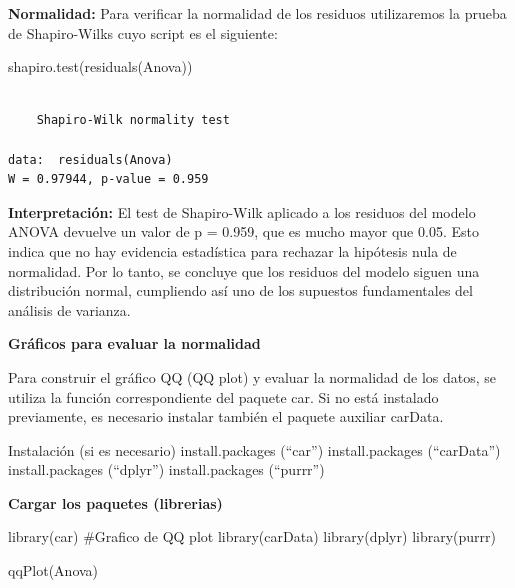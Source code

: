 \documentclass[
  letterpaper,
  DIV=11,
  numbers=noendperiod]{scrreprt}
\newenvironment{Shaded}{\begin{snugshade}}{\end{snugshade}}
\newcommand{\CommentTok}[1]{\textcolor[rgb]{0.37,0.37,0.37}{#1}}
\newcommand{\FunctionTok}[1]{\textcolor[rgb]{0.28,0.35,0.67}{#1}}
\newcommand{\NormalTok}[1]{\textcolor[rgb]{0.00,0.23,0.31}{#1}}
\begin{document}
\textbf{Normalidad:} Para verificar la normalidad de los residuos
utilizaremos la prueba de Shapiro-Wilks cuyo script es el siguiente:

\begin{Shaded}
\begin{Highlighting}[]
\FunctionTok{shapiro.test}\NormalTok{(}\FunctionTok{residuals}\NormalTok{(Anova))}
\end{Highlighting}
\end{Shaded}

\begin{verbatim}

    Shapiro-Wilk normality test

data:  residuals(Anova)
W = 0.97944, p-value = 0.959
\end{verbatim}

\textbf{Interpretación:} El test de Shapiro-Wilk aplicado a los residuos
del modelo ANOVA devuelve un valor de p = 0.959, que es mucho mayor que
0.05. Esto indica que no hay evidencia estadística para rechazar la
hipótesis nula de normalidad. Por lo tanto, se concluye que los residuos
del modelo siguen una distribución normal, cumpliendo así uno de los
supuestos fundamentales del análisis de varianza.

\textbf{Gráficos para evaluar la normalidad}

Para construir el gráfico QQ (QQ plot) y evaluar la normalidad de los
datos, se utiliza la función correspondiente del paquete car. Si no está
instalado previamente, es necesario instalar también el paquete auxiliar
carData.

Instalación (si es necesario) install.packages (``car'')
install.packages (``carData'') install.packages (``dplyr'')
install.packages (``purrr'')

\textbf{Cargar los paquetes (librerias)}

\begin{Shaded}
\begin{Highlighting}[]
\FunctionTok{library}\NormalTok{(car) }\CommentTok{\#Grafico de QQ plot}
\FunctionTok{library}\NormalTok{(carData)}
\FunctionTok{library}\NormalTok{(dplyr)}
\FunctionTok{library}\NormalTok{(purrr)}

\FunctionTok{qqPlot}\NormalTok{(Anova)}
\end{Highlighting}
\end{Shaded}
\end{document}
